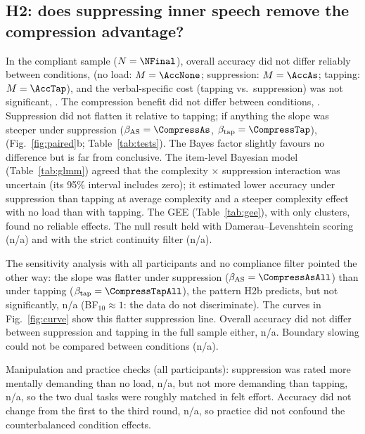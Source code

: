 \documentclass[11pt,a4paper]{article}
\providecommand{\CheckPractice}{n/a}
\providecommand{\HtwoBoundaryAsTap}{n/a}
\providecommand{\CheckEffortAsTap}{n/a}
\providecommand{\HtwoAsTapDL}{n/a}
\providecommand{\HtwoAsTapUnfiltered}{n/a}
\providecommand{\HtwoAsTapStrict}{n/a}
\providecommand{\HtwoCostAsTapAll}{n/a}
\providecommand{\CheckEffortAsNone}{n/a}
\begin{document}
\subsection{H2: does suppressing inner speech remove the compression advantage?}
In the compliant sample ($N = \NFinal$), overall accuracy did not differ reliably between conditions, \AccAov{} (no load:
$M = \AccNone$; suppression: $M = \AccAs$; tapping: $M = \AccTap$), and the verbal-specific cost (tapping vs.\ suppression)
was not significant, \HtwoCostAsTap. The compression benefit did not differ between conditions, \SlopeAov. Suppression did not
flatten it relative to tapping; if anything the slope was steeper under suppression ($\beta_{\text{AS}} = \CompressAs$,
$\beta_{\text{tap}} = \CompressTap$), \HtwoAsTap{} (Fig.~\ref{fig:paired}b; Table~\ref{tab:tests}). The Bayes factor slightly
favours no difference but is far from conclusive. The item-level Bayesian model (Table~\ref{tab:glmm}) agreed that the
complexity $\times$ suppression interaction was uncertain (its 95\% interval includes zero); it estimated lower accuracy under
suppression than tapping at average complexity and a steeper complexity effect with no load than with tapping. The GEE
(Table~\ref{tab:gee}), with only \NFinal{} clusters, found no reliable effects. The null result held with Damerau--Levenshtein
scoring (\HtwoAsTapDL) and with the strict continuity filter (\HtwoAsTapStrict).

The sensitivity analysis with all \NAll{} participants and no compliance filter pointed the other way: the slope was flatter
under suppression ($\beta_{\text{AS}} = \CompressAsAll$) than under tapping ($\beta_{\text{tap}} = \CompressTapAll$), the
pattern H2b predicts, but not significantly, \HtwoAsTapUnfiltered{} (BF$_{10} \approx 1$: the data do not discriminate). The
curves in Fig.~\ref{fig:curve} show this flatter suppression line. Overall accuracy did not differ between suppression and
tapping in the full sample either, \HtwoCostAsTapAll. Boundary slowing could not be compared between conditions
(\HtwoBoundaryAsTap).

Manipulation and practice checks (all participants): suppression was rated more mentally demanding than no load,
\CheckEffortAsNone, but not more demanding than tapping, \CheckEffortAsTap, so the two dual tasks were roughly matched in
felt effort. Accuracy did not change from the first to the third round, \CheckPractice, so practice did not confound the
counterbalanced condition effects.
\end{document}
